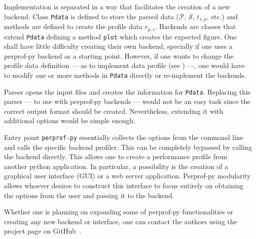 Implementation is separated in a way that facilitates the creation of a
new backend.
Class {\tt Pdata} is defined to store the parsed data ($\mathcal{P}$,
$\mathcal{S}$, $t_{s,p}$, etc.) and  methods are defined to create the profile data
$r_{p,s}$.
Backends are classes that extend {\tt Pdata} defining a method {\tt plot}
which creates the expected figure.
One shall have little difficulty creating their own backend, specially if one
uses a perprof-py backend as a starting point.
However, if one wants to change the profile data definition --- as
to implement  data profile (see \cite{bib:more2009benchmarking}) ---, one would have to modify one or more methods in {\tt Pdata} directly or re-implement the backends.

Parser opens the input files and creates the information for {\tt Pdata}.
Replacing this parser --- to use with perprof-py backends --- would not be an easy task
since the correct output format should be created.  Nevertheless,
extending it with additional options would be simple enough.

Entry point {\tt perprof-py} essentially collects the options from the command
line and calls the specific backend profiler. This can be completely bypassed
by calling the backend directly. This allows one to create a performance
profile from another python application. In particular, a possibility is the
creation of a graphical user interface (GUI)
or a web server application. Perprof-py modularity 
allows whoever desires to construct this interface to focus entirely on
obtaining the options from the user and passing it to the backend.

Whether one is planning on expanding some of perprof-py functionalities or creating any
new backend or interface, one can contact the authors using the project page on
GitHub~\cite{url:perprof-py}.

